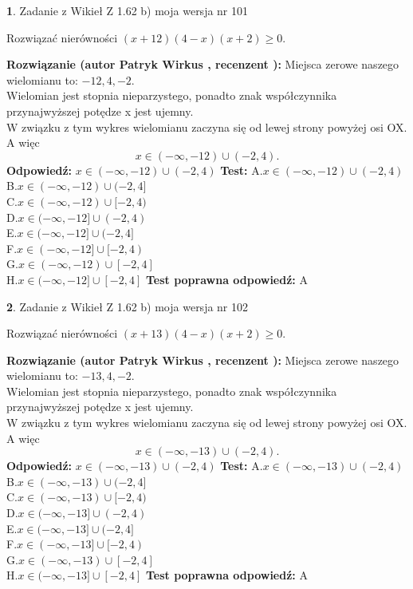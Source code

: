\documentclass[12pt, a4paper]{article}
\theoremstyle{definition} %
\newtheorem{zad}{}
\newcommand{\zadStart}[1]{\begin{zad}#1\newline}
\newcommand{\zadStop}{\end{zad}}
\newcommand{\rozwStart}[2]{\noindent \textbf{Rozwiązanie (autor #1 , recenzent #2): }\newline}
\newcommand{\rozwStop}{\newline}
\newcommand{\odpStart}{\noindent \textbf{Odpowiedź:}\newline}
\newcommand{\odpStop}{\newline}
\newcommand{\testStart}{\noindent \textbf{Test:}\newline}
\newcommand{\testStop}{\newline}
\newcommand{\kluczStart}{\noindent \textbf{Test poprawna odpowiedź:}\newline}
\newcommand{\kluczStop}{\newline}
\begin{document}
\zadStart{Zadanie z Wikieł Z 1.62 b) moja wersja nr 101}

Rozwiązać nierówności $(x+12)(4-x)(x+2)\ge0$.
\zadStop
\rozwStart{Patryk Wirkus}{}
Miejsca zerowe naszego wielomianu to: $-12, 4, -2$.\\
Wielomian jest stopnia nieparzystego, ponadto znak współczynnika przy\linebreak najwyższej potędze x jest ujemny.\\ W związku z tym wykres wielomianu zaczyna się od lewej strony powyżej osi OX. A więc $$x \in (-\infty,-12) \cup (-2,4).$$
\rozwStop
\odpStart
$x \in (-\infty,-12) \cup (-2,4)$
\odpStop
\testStart
A.$x \in (-\infty,-12) \cup (-2,4)$\\
B.$x \in (-\infty,-12) \cup (-2,4]$\\
C.$x \in (-\infty,-12) \cup [-2,4)$\\
D.$x \in (-\infty,-12] \cup (-2,4)$\\
E.$x \in (-\infty,-12] \cup (-2,4]$\\
F.$x \in (-\infty,-12] \cup [-2,4)$\\
G.$x \in (-\infty,-12) \cup [-2,4]$\\
H.$x \in (-\infty,-12] \cup [-2,4]$
\testStop
\kluczStart
A
\kluczStop



\zadStart{Zadanie z Wikieł Z 1.62 b) moja wersja nr 102}

Rozwiązać nierówności $(x+13)(4-x)(x+2)\ge0$.
\zadStop
\rozwStart{Patryk Wirkus}{}
Miejsca zerowe naszego wielomianu to: $-13, 4, -2$.\\
Wielomian jest stopnia nieparzystego, ponadto znak współczynnika przy\linebreak najwyższej potędze x jest ujemny.\\ W związku z tym wykres wielomianu zaczyna się od lewej strony powyżej osi OX. A więc $$x \in (-\infty,-13) \cup (-2,4).$$
\rozwStop
\odpStart
$x \in (-\infty,-13) \cup (-2,4)$
\odpStop
\testStart
A.$x \in (-\infty,-13) \cup (-2,4)$\\
B.$x \in (-\infty,-13) \cup (-2,4]$\\
C.$x \in (-\infty,-13) \cup [-2,4)$\\
D.$x \in (-\infty,-13] \cup (-2,4)$\\
E.$x \in (-\infty,-13] \cup (-2,4]$\\
F.$x \in (-\infty,-13] \cup [-2,4)$\\
G.$x \in (-\infty,-13) \cup [-2,4]$\\
H.$x \in (-\infty,-13] \cup [-2,4]$
\testStop
\kluczStart
A
\kluczStop
\end{document}
